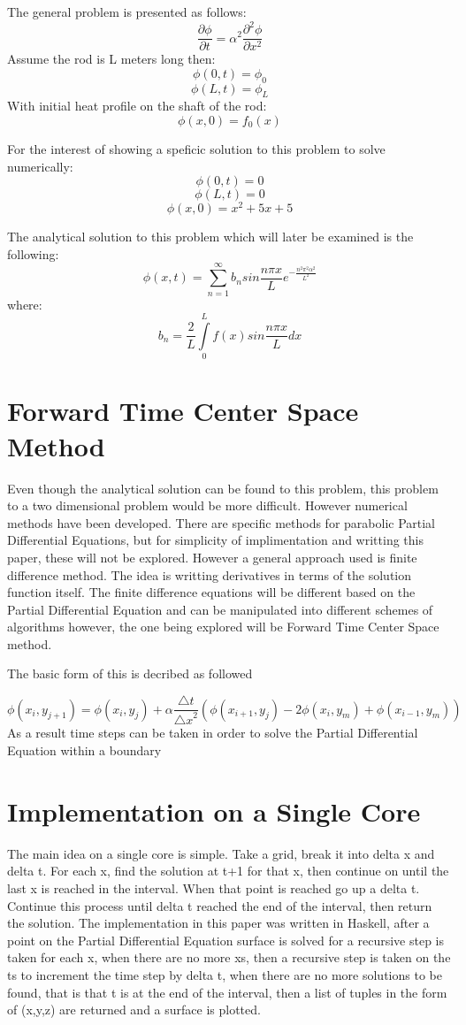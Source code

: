 \documentclass{sig-alternate}
\begin{document}
The general problem is presented as follows:
\[ \frac{\partial \phi}{\partial t}= \alpha^2 \frac{\partial^2 \phi}{\partial x^2} \]
Assume the rod is L meters long then:
\[  \phi(0,t)=\phi_0  \] 
\[  \phi(L,t)=\phi_L  \]   
With initial heat profile on the shaft of the rod:
\[  \phi(x,0)=f_0(x)  \] 

For the interest of showing a speficic solution to this problem to solve numerically:
\[  \phi(0,t)=0  \] 
\[  \phi(L,t)=0 \]  
\[  \phi(x,0)=x^2 +5x + 5  \]

The analytical solution to this problem which will later be examined is the following:
\[  \phi(x,t)=\sum_{n=1}^{\infty} b_n sin\frac{n{\pi}x}{L}e^{-\frac {n^2\pi^2\alpha^2} {L^2}} \]
where:
\[  b_n={\frac {2} {L}}\int \limits_0^L {f(x)sin \frac{n{\pi}x}{L} dx} \] 


\section{Forward Time Center Space Method}
\label{FTCSP}
Even though the analytical solution can be found to this problem, this problem to a two dimensional problem would be more difficult. However numerical methods have been developed. There are specific methods for parabolic Partial Differential Equations, but for simplicity of implimentation and writting this paper, these will not be explored. However a general approach used is finite difference method. The idea is writting derivatives in terms of the solution function itself. The finite difference equations will be different based on the Partial Differential Equation and can be manipulated into different schemes of algorithms however, the one being explored will be Forward Time Center Space method. 

The basic form of this is decribed as followed

\[  \phi(x_i,y_{j+1})= \phi(x_i,y_j) + \alpha \frac {\bigtriangleup t} {{\bigtriangleup x}^2}(\phi(x_{i+1},y_j) -2\phi(x_i,y_m) + \phi(x_{i-1},y_m)) \] 
As a result time steps can be taken in order to solve the Partial Differential Equation within a boundary
\section{Implementation on a Single Core}
\label{Implementation}
The main idea on a single core is simple. Take a grid, break it into delta x and delta t. For each x, find the solution at t+1 for that x, then continue on until the last x is reached in the interval. When that point is reached go up a delta t. Continue this process until delta t reached the end of the interval, then return the solution. The implementation in this paper was written in Haskell, after a point on the Partial Differential Equation surface is solved for a recursive step is taken for each x, when there are no more xs, then a recursive step is taken on the ts to increment the time step by delta t, when there are no more solutions to be found, that is that t is at the end of the interval, then a list of tuples in the form of (x,y,z) are returned and a surface is plotted. 
\end{document}
